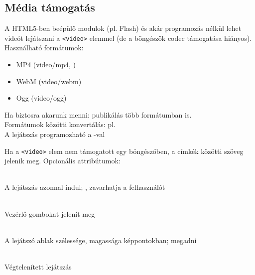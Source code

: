 \subsection{Média támogatás}

\begin{frame}
  A HTML5-ben beépülő modulok (pl. Flash) és akár programozás nélkül 
  lehet videót lejátszani a \texttt{<video>} elemmel (de a böngészők codec 
  támogatása hiányos). Használható formátumok:
  \begin{itemize}
    \item MP4 (video/mp4, )
    \item WebM (video/webm)
    \item Ogg (video/ogg)
  \end{itemize}
  Ha biztosra akarunk menni: publikálás több formátumban is.\\
  Formátumok közötti konvertálás: pl. 
  \\
  A lejátszás programozható a -val\\
\end{frame}

\begin{frame}
  Ha a \texttt{<video>} elem nem támogatott egy böngészőben, a 
  címkék közötti szöveg jelenik meg. Opcionális attribútumok:
  \begin{description}[m]
    \item[\texttt{<autoplay>}] \hfill \\ A lejátszás azonnal indul; 
    , zavarhatja a felhasználót
    \item[\texttt{<controls>}] \hfill \\ Vezérlő gombokat jelenít meg
    \item[\texttt{<width>}, \texttt{<height>}] \hfill \\ A lejátszó 
    ablak szélessége, magassága képpontokban;  megadni
    \item[\texttt{<loop>}] \hfill \\ Végtelenített lejátszás
  \end{description}
\end{frame}

